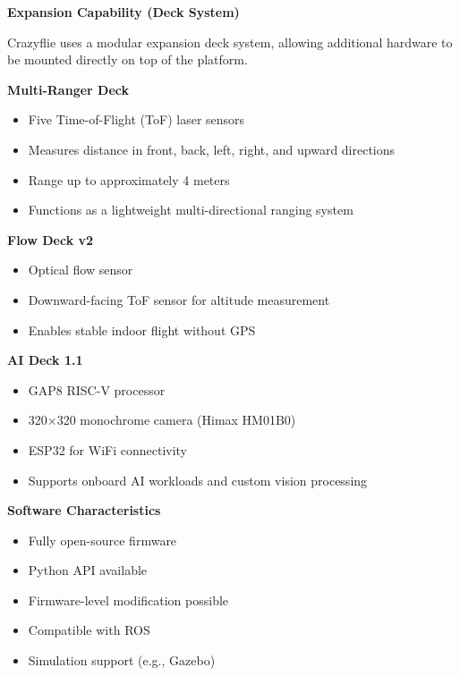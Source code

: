 \documentclass{book}
\providecommand{\ProjectDeepHeading}[2]{%
    \par\medskip\noindent\textbf{#2}\par\smallskip
}
\begin{document}
        \ProjectDeepHeading{6}{Expansion Capability (Deck System)}
            
            Crazyflie uses a modular expansion deck system, allowing additional hardware to be mounted directly on top of the platform.
            
            \ProjectDeepHeading{7}{Multi-Ranger Deck}
            
            \begin{itemize}
                \item Five Time-of-Flight (ToF) laser sensors
                \item Measures distance in front, back, left, right, and upward directions
                \item Range up to approximately 4 meters
                \item Functions as a lightweight multi-directional ranging system
                \end{itemize}
            
            \ProjectDeepHeading{7}{Flow Deck v2}
            
            \begin{itemize}
                \item Optical flow sensor
                \item Downward-facing ToF sensor for altitude measurement
                \item Enables stable indoor flight without GPS
                \end{itemize}
            
            \ProjectDeepHeading{7}{AI Deck 1.1}
            
            \begin{itemize}
                \item GAP8 RISC-V processor
                \item 320×320 monochrome camera (Himax HM01B0)
                \item ESP32 for WiFi connectivity
                \item Supports onboard AI workloads and custom vision processing
                \end{itemize}
        
        \ProjectDeepHeading{6}{Software Characteristics}
            
            \begin{itemize}
                \item Fully open-source firmware
                \item Python API available
                \item Firmware-level modification possible
                \item Compatible with ROS
                \item Simulation support (e.g., Gazebo)
            \end{itemize}
        
\end{document}
